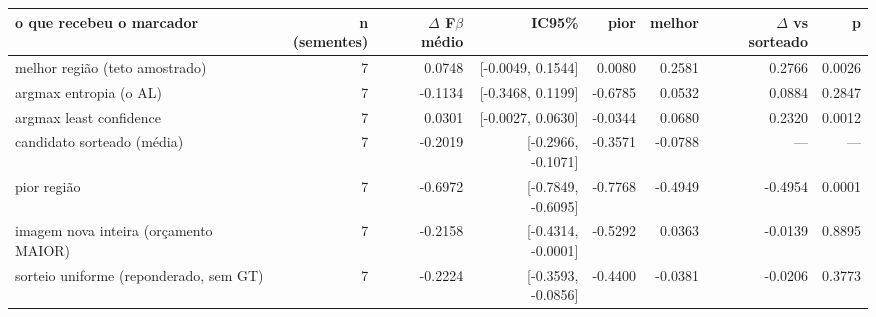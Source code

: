 \begin{tabular}{lrrrrrrr}
\hline
o que recebeu o marcador & n (sementes) & $\Delta$ F$\beta$ médio & IC95\% & pior & melhor & $\Delta$ vs sorteado & p \\
\hline
melhor região (teto amostrado) & 7 & 0.0748 & [-0.0049, 0.1544] & 0.0080 & 0.2581 & 0.2766 & 0.0026 \\
argmax entropia (o AL) & 7 & -0.1134 & [-0.3468, 0.1199] & -0.6785 & 0.0532 & 0.0884 & 0.2847 \\
argmax least confidence & 7 & 0.0301 & [-0.0027, 0.0630] & -0.0344 & 0.0680 & 0.2320 & 0.0012 \\
candidato sorteado (média) & 7 & -0.2019 & [-0.2966, -0.1071] & -0.3571 & -0.0788 & --- & --- \\
pior região & 7 & -0.6972 & [-0.7849, -0.6095] & -0.7768 & -0.4949 & -0.4954 & 0.0001 \\
imagem nova inteira (orçamento MAIOR) & 7 & -0.2158 & [-0.4314, -0.0001] & -0.5292 & 0.0363 & -0.0139 & 0.8895 \\
sorteio uniforme (reponderado, sem GT) & 7 & -0.2224 & [-0.3593, -0.0856] & -0.4400 & -0.0381 & -0.0206 & 0.3773 \\
\hline
\end{tabular}
